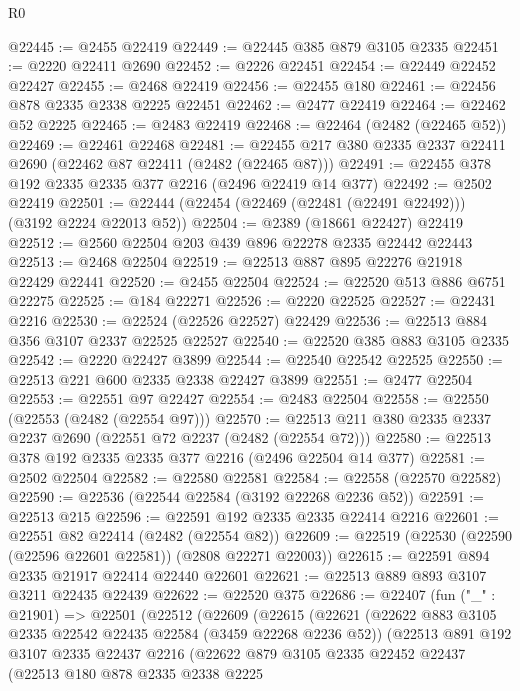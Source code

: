 \begin{lexlean}{R0}
\begin{coremodule}
@22445 := @2455 @22419
@22449 := @22445 @385 @879 @3105 @2335
@22451 := @2220 @22411 @2690
@22452 := @2226 @22451
@22454 := @22449 @22452 @22427
@22455 := @2468 @22419
@22456 := @22455 @180
@22461 := @22456 @878 @2335 @2338 @2225 @22451
@22462 := @2477 @22419
@22464 := @22462 @52 @2225
@22465 := @2483 @22419
@22468 := @22464 (@2482 (@22465 @52))
@22469 := @22461 @22468
@22481 := @22455 @217 @380 @2335 @2337 @22411 @2690 (@22462 @87 @22411 (@2482 (@22465 @87)))
@22491 := @22455 @378 @192 @2335 @2335 @377 @2216 (@2496 @22419 @14 @377)
@22492 := @2502 @22419
@22501 := @22444 (@22454 (@22469 (@22481 (@22491 @22492))) (@3192 @2224 @22013 @52))
@22504 := @2389 (@18661 @22427) @22419
@22512 := @2560 @22504 @203 @439 @896 @22278 @2335 @22442 @22443
@22513 := @2468 @22504
@22519 := @22513 @887 @895 @22276 @21918 @22429 @22441
@22520 := @2455 @22504
@22524 := @22520 @513 @886 @6751 @22275
@22525 := @184 @22271
@22526 := @2220 @22525
@22527 := @22431 @2216
@22530 := @22524 (@22526 @22527) @22429
@22536 := @22513 @884 @356 @3107 @2337 @22525 @22527
@22540 := @22520 @385 @883 @3105 @2335
@22542 := @2220 @22427 @3899
@22544 := @22540 @22542 @22525
@22550 := @22513 @221 @600 @2335 @2338 @22427 @3899
@22551 := @2477 @22504
@22553 := @22551 @97 @22427
@22554 := @2483 @22504
@22558 := @22550 (@22553 (@2482 (@22554 @97)))
@22570 := @22513 @211 @380 @2335 @2337 @2237 @2690 (@22551 @72 @2237 (@2482 (@22554 @72)))
@22580 := @22513 @378 @192 @2335 @2335 @377 @2216 (@2496 @22504 @14 @377)
@22581 := @2502 @22504
@22582 := @22580 @22581
@22584 := @22558 (@22570 @22582)
@22590 := @22536 (@22544 @22584 (@3192 @22268 @2236 @52))
@22591 := @22513 @215
@22596 := @22591 @192 @2335 @2335 @22414 @2216
@22601 := @22551 @82 @22414 (@2482 (@22554 @82))
@22609 := @22519 (@22530 (@22590 (@22596 @22601 @22581)) (@2808 @22271 @22003))
@22615 := @22591 @894 @2335 @21917 @22414 @22440 @22601
@22621 := @22513 @889 @893 @3107 @3211 @22435 @22439
@22622 := @22520 @375
@22686 := @22407
    (fun ("_" : @21901) =>
    @22501
      (@22512
        (@22609
          (@22615
            (@22621
              (@22622 @883 @3105 @2335 @22542 @22435 @22584 (@3459 @22268 @2236 @52))
              (@22513
                @891
                @192
                @3107
                @2335
                @22437
                @2216
                (@22622
                  @879
                  @3105
                  @2335
                  @22452
                  @22437
                  (@22513
                    @180
                    @878
                    @2335
                    @2338
                    @2225

\end{coremodule}
\end{lexlean}
